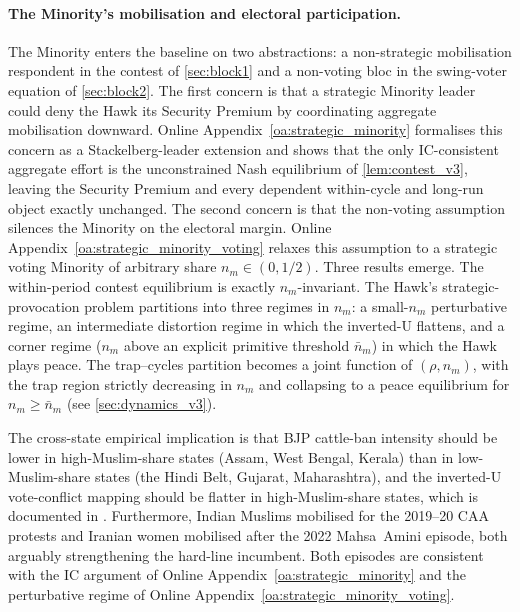 \documentclass[11pt,twoside]{extarticle}
\begin{document}
\paragraph{The Minority's mobilisation and electoral participation.} The Minority enters the baseline on two abstractions: a non-strategic mobilisation respondent in the contest of \autoref{sec:block1} and a non-voting bloc in the swing-voter equation of \autoref{sec:block2}. The first concern is that a strategic Minority leader could deny the Hawk its Security Premium by coordinating aggregate mobilisation downward. Online Appendix~\ref{oa:strategic_minority} formalises this concern as a Stackelberg-leader extension and shows that the only IC-consistent aggregate effort is the unconstrained Nash equilibrium of \autoref{lem:contest_v3}, leaving the Security Premium and every dependent within-cycle and long-run object exactly unchanged. The second concern is that the non-voting assumption silences the Minority on the electoral margin. Online Appendix~\ref{oa:strategic_minority_voting} relaxes this assumption to a strategic voting Minority of arbitrary share $n_m\in(0,1/2)$. Three results emerge. The within-period contest equilibrium is exactly $n_m$-invariant. The Hawk's strategic-provocation problem partitions into three regimes in $n_m$: a small-$n_m$ perturbative regime, an intermediate distortion regime in which the inverted-U flattens, and a corner regime ($n_m$ above an explicit primitive threshold $\bar n_m$) in which the Hawk plays peace. The trap--cycles partition becomes a joint function of $(\rho,n_m)$, with the trap region strictly decreasing in $n_m$ and collapsing to a peace equilibrium for $n_m\ge\bar n_m$ (see \autoref{sec:dynamics_v3}). 

The cross-state empirical implication is that BJP cattle-ban intensity should be lower in high-Muslim-share states (Assam, West Bengal, Kerala) than in low-Muslim-share states (the Hindi Belt, Gujarat, Maharashtra), and the inverted-U vote-conflict mapping should be flatter in high-Muslim-share states, which is documented in \citet*{jaffrelotModisIndiaHindu2021}. Furthermore, Indian Muslims mobilised for the 2019--20 CAA protests and Iranian women mobilised after the 2022 Mahsa~Amini episode, both arguably strengthening the hard-line incumbent. Both episodes are consistent with the IC argument of Online Appendix~\ref{oa:strategic_minority} and the perturbative regime of Online Appendix~\ref{oa:strategic_minority_voting}.
\end{document}
